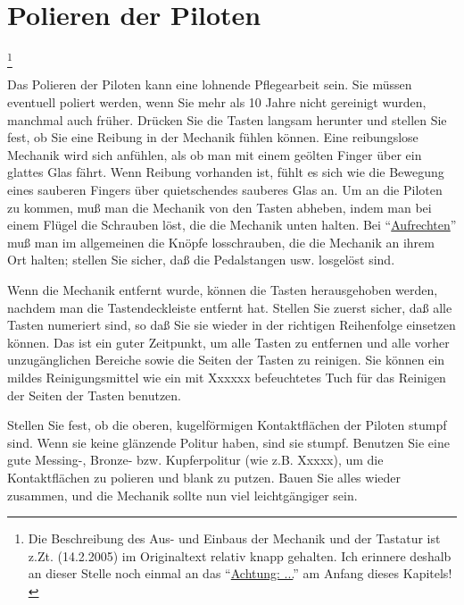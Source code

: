 \hypertarget{c2_7b}{}
\section{Polieren der Piloten}\hypertarget{c2_7_pilo}{} 

\footnote{Die Beschreibung des  Aus- und Einbaus der Mechanik und der Tastatur ist z.Zt. (14.2.2005) im Originaltext relativ knapp gehalten.
Ich erinnere deshalb an dieser Stelle noch einmal an das \enquote{\hyperlink{c2_1}{Achtung: ...}} am Anfang dieses Kapitels!}

Das Polieren der Piloten kann eine lohnende Pflegearbeit sein.
Sie müssen eventuell poliert werden, wenn Sie mehr als 10 Jahre nicht gereinigt wurden, manchmal auch früher.
Drücken Sie die Tasten langsam herunter und stellen Sie fest, ob Sie eine Reibung in der Mechanik fühlen können.
Eine reibungslose Mechanik wird sich anfühlen, als ob man mit einem geölten Finger über ein glattes Glas fährt.
Wenn Reibung vorhanden ist, fühlt es sich wie die Bewegung eines sauberen Fingers über quietschendes sauberes Glas an.
Um an die Piloten zu kommen, muß man die Mechanik von den Tasten abheben, indem man bei einem Flügel die Schrauben löst, die die Mechanik unten halten.
Bei \enquote{\hyperlink{upright}{Aufrechten}} muß man im allgemeinen die Knöpfe losschrauben, die die Mechanik an ihrem Ort halten; stellen Sie sicher, daß die Pedalstangen usw. losgelöst sind.

Wenn die Mechanik entfernt wurde, können die Tasten herausgehoben werden, nachdem man die Tastendeckleiste entfernt hat.
Stellen Sie zuerst sicher, daß alle Tasten numeriert sind, so daß Sie sie wieder in der richtigen Reihenfolge einsetzen können.
Das ist ein guter Zeitpunkt, um alle Tasten zu entfernen und alle vorher unzugänglichen Bereiche sowie die Seiten der Tasten zu reinigen.
Sie können ein mildes Reinigungsmittel wie ein mit Xxxxxx befeuchtetes Tuch für das Reinigen der Seiten der Tasten benutzen.

Stellen Sie fest, ob die oberen, kugelförmigen Kontaktflächen der Piloten stumpf sind.
Wenn sie keine glänzende Politur haben, sind sie stumpf.
Benutzen Sie eine gute Messing-, Bronze- bzw. Kupferpolitur (wie z.B. Xxxxx), um die Kontaktflächen zu polieren und blank zu putzen.
Bauen Sie alles wieder zusammen, und die Mechanik sollte nun viel leichtgängiger sein.
 





